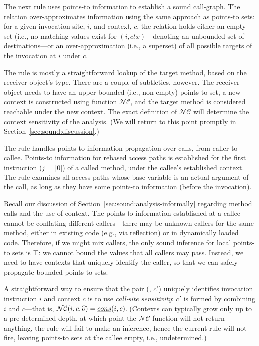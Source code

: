 The next rule uses points-to information to establish a sound call-graph. The  relation over-approximates information using the same approach as points-to sets: for a given invocation site, $i$, and context, $c$, the relation holds either an empty set (i.e., no matching values exist for $(i, ctx)$---denoting an unbounded set of destinations---or an over-approximation (i.e., a superset) of all possible targets of the invocation at $i$ under $c$.

The rule is mostly a straightforward lookup of the target method, based on the receiver object's type. There are a couple of subtleties, however. The receiver object needs to have an upper-bounded (i.e., non-empty) points-to set, a new context is constructed using function $\mathcal{NC}$, and the target method is considered reachable under the new context. The exact definition of $\mathcal{NC}$ will determine the context sensitivity of the analysis. (We will return to this point promptly in Section~\ref{sec:sound:discussion}.)


The  rule handles points-to information propagation over calls, from caller to callee. Points-to information for rebased access paths is established for the first instruction ($j$ = [0]) of a called method, under the callee's established context. The rule examines all access paths whose base variable is an actual argument of the call, as long as they have some points-to information (before the invocation).

Recall our discussion of Section~\ref{sec:sound:analysis-informally} regarding method calls and the use of context. The points-to information established at a callee cannot be conflating different callers---there may be unknown callers for the same method, either in existing code (e.g., via reflection) or in dynamically loaded code. Therefore, if we might mix callers, the only sound inference for local points-to sets is $\top$: we cannot bound the values that all callers may pass. Instead, we need to have contexts that uniquely identify the caller, so that we can safely propagate bounded points-to sets.

A straightforward way to ensure that the pair (, $c'$) uniquely identifies invocation instruction $i$ and context $c$ is to use \emph{call-site sensitivity}: $c'$ is formed by combining $i$ and $c$---that is, $\mathcal{NC}(i, c, \widehat{o}) = \emph{cons}(i, c)$. (Contexts can typically grow only up to a pre-determined depth, at which point the $\mathcal{NC}$ function will not return anything, the  rule will fail to make an inference, hence the current rule will not fire, leaving points-to sets at the callee empty, i.e., undetermined.)


